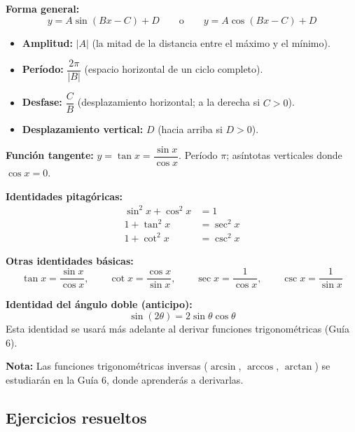 \documentclass[12pt, a4paper]{article}
\begin{document}
  \begin{cuadroteoria}
    \textbf{Forma general:}
    $$y = A\sin(Bx - C) + D \qquad \text{o} \qquad y = A\cos(Bx - C) + D$$

    \begin{itemize}[leftmargin=*]
      \item \textbf{Amplitud:} $|A|$ (la mitad de la distancia entre el máximo y el mínimo).
      \item \textbf{Período:} $\dfrac{2\pi}{|B|}$ (espacio horizontal de un ciclo completo).
      \item \textbf{Desfase:} $\dfrac{C}{B}$ (desplazamiento horizontal; a la derecha si $C > 0$).
      \item \textbf{Desplazamiento vertical:} $D$ (hacia arriba si $D > 0$).
    \end{itemize}

    \textbf{Función tangente:} $y = \tan x = \dfrac{\sin x}{\cos x}$. Período $\pi$; asíntotas verticales donde $\cos x = 0$.
  \end{cuadroteoria}

  \begin{cuadrosolucion}
    \textbf{Identidades pitagóricas:}
    \begin{align*}
      \sin^2 x + \cos^2 x & = 1        \\
      1 + \tan^2 x        & = \sec^2 x \\
      1 + \cot^2 x        & = \csc^2 x
    \end{align*}

    \textbf{Otras identidades básicas:}
    $$\tan x = \frac{\sin x}{\cos x}, \qquad \cot x = \frac{\cos x}{\sin x}, \qquad \sec x = \frac{1}{\cos x}, \qquad \csc x = \frac{1}{\sin x}$$

    \textbf{Identidad del ángulo doble (anticipo):}
    $$\sin(2\theta) = 2\sin\theta\cos\theta$$
    Esta identidad se usará más adelante al derivar funciones trigonométricas (Guía 6).
  \end{cuadrosolucion}

  \begin{cuadroinfo}
    \textbf{Nota:} Las funciones trigonométricas inversas ($\arcsin$, $\arccos$, $\arctan$) se estudiarán en la Guía 6, donde aprenderás a derivarlas.
  \end{cuadroinfo}

  \subsection{Ejercicios resueltos}
\end{document}
